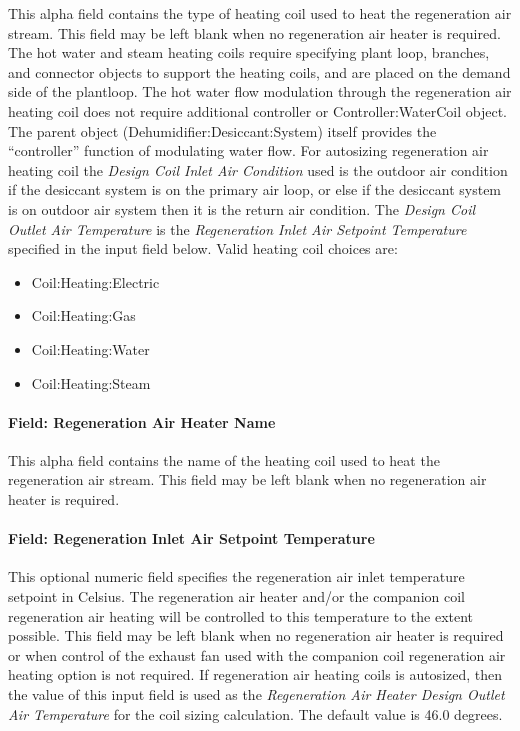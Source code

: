 This alpha field contains the type of heating coil used to heat the regeneration air stream. This field may be left blank when no regeneration air heater is required. The hot water and steam heating coils require specifying plant loop, branches, and connector objects to support the heating coils, and are placed on the demand side of the plantloop. The hot water flow modulation through the regeneration air heating coil does not require additional controller or Controller:WaterCoil object. The parent object (Dehumidifier:Desiccant:System) itself provides the ``controller'' function of modulating water flow. For autosizing regeneration air heating coil the \emph{Design Coil Inlet Air Condition} used is the outdoor air condition if the desiccant system is on the primary air loop, or else if the desiccant system is on outdoor air system then it is the return air condition. The \emph{Design Coil Outlet Air Temperature} is the \emph{Regeneration Inlet Air Setpoint Temperature} specified in the input field below. Valid heating coil choices are:

\begin{itemize}
\item
  Coil:Heating:Electric
\item
  Coil:Heating:Gas
\item
  Coil:Heating:Water
\item
  Coil:Heating:Steam
\end{itemize}

\paragraph{Field: Regeneration Air Heater Name}\label{field-regeneration-air-heater-name}

This alpha field contains the name of the heating coil used to heat the regeneration air stream. This field may be left blank when no regeneration air heater is required.

\paragraph{Field: Regeneration Inlet Air Setpoint Temperature}\label{field-regeneration-inlet-air-setpoint-temperature}

This optional numeric field specifies the regeneration air inlet temperature setpoint in Celsius. The regeneration air heater and/or the companion coil regeneration air heating will be controlled to this temperature to the extent possible. This field may be left blank when no regeneration air heater is required or when control of the exhaust fan used with the companion coil regeneration air heating option is not required. If regeneration air heating coils is autosized, then the value of this input field is used as the \emph{Regeneration Air Heater Design Outlet Air Temperature} for the coil sizing calculation. The default value is 46.0 degrees.

